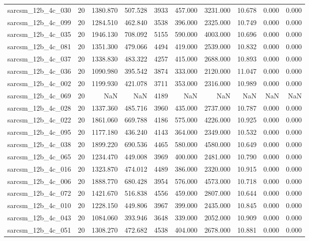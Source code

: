 \begin{tabular}{lrrrrrrrrr}
sarcsm\_12b\_4c\_030 & 20 & 1380.870 & 507.528 & 3933 & 457.000 & 3231.000 & 10.678 & 0.000 & 0.000 \\
sarcsm\_12b\_4c\_099 & 20 & 1284.510 & 462.840 & 3538 & 396.000 & 2325.000 & 10.749 & 0.000 & 0.000 \\
sarcsm\_12b\_4c\_035 & 20 & 1946.130 & 708.092 & 5155 & 590.000 & 4003.000 & 10.696 & 0.000 & 0.000 \\
sarcsm\_12b\_4c\_081 & 20 & 1351.300 & 479.066 & 4494 & 419.000 & 2539.000 & 10.832 & 0.000 & 0.000 \\
sarcsm\_12b\_4c\_037 & 20 & 1338.830 & 483.322 & 4257 & 415.000 & 2688.000 & 10.893 & 0.000 & 0.000 \\
sarcsm\_12b\_4c\_036 & 20 & 1090.980 & 395.542 & 3874 & 333.000 & 2120.000 & 11.047 & 0.000 & 0.000 \\
sarcsm\_12b\_4c\_002 & 20 & 1199.930 & 421.078 & 3711 & 353.000 & 2316.000 & 10.989 & 0.000 & 0.000 \\
sarcsm\_12b\_4c\_069 & 20 & NaN & NaN & 4189 & NaN & NaN & NaN & NaN & NaN \\
sarcsm\_12b\_4c\_028 & 20 & 1337.360 & 485.716 & 3960 & 435.000 & 2737.000 & 10.787 & 0.000 & 0.000 \\
sarcsm\_12b\_4c\_022 & 20 & 1861.060 & 669.788 & 4186 & 575.000 & 4226.000 & 10.925 & 0.000 & 0.000 \\
sarcsm\_12b\_4c\_095 & 20 & 1177.180 & 436.240 & 4143 & 364.000 & 2349.000 & 10.532 & 0.000 & 0.000 \\
sarcsm\_12b\_4c\_038 & 20 & 1899.220 & 690.536 & 4465 & 580.000 & 4580.000 & 10.649 & 0.000 & 0.000 \\
sarcsm\_12b\_4c\_065 & 20 & 1234.470 & 449.008 & 3969 & 400.000 & 2481.000 & 10.790 & 0.000 & 0.000 \\
sarcsm\_12b\_4c\_016 & 20 & 1323.870 & 474.012 & 4489 & 386.000 & 2320.000 & 10.915 & 0.000 & 0.000 \\
sarcsm\_12b\_4c\_006 & 20 & 1888.770 & 680.428 & 3954 & 576.000 & 4573.000 & 10.718 & 0.000 & 0.000 \\
sarcsm\_12b\_4c\_072 & 20 & 1421.670 & 516.838 & 4556 & 459.000 & 2807.000 & 10.644 & 0.000 & 0.000 \\
sarcsm\_12b\_4c\_010 & 20 & 1228.150 & 449.806 & 3967 & 399.000 & 2435.000 & 10.845 & 0.000 & 0.000 \\
sarcsm\_12b\_4c\_043 & 20 & 1084.060 & 393.946 & 3648 & 339.000 & 2052.000 & 10.909 & 0.000 & 0.000 \\
sarcsm\_12b\_4c\_051 & 20 & 1308.270 & 472.682 & 4538 & 404.000 & 2678.000 & 10.881 & 0.000 & 0.000 \\

\end{tabular}
